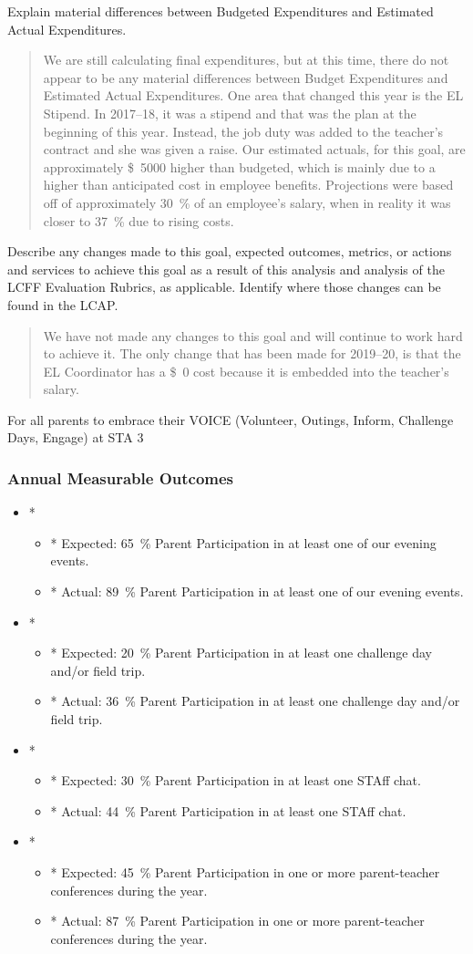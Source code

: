 \documentclass{article}
\newcommand{\dollar}[1]{\SI{#1}[\$]{}}
\newcounter{goal}[section] %
\newcommand{\outcome}[2]{
	\item*
	\begin{itemize}
	\setlength{\itemsep}{0pt}
	\item* Expected: #1
	\item* Actual: #2
	\end{itemize}
}
\newenvironment{outcomes}
	{
		\subsubsection{Annual Measurable Outcomes}
		\begin{itemize}
	}
	{\end{itemize}}
\newcounter{action}[goal]
\begin{document}
Explain material differences between Budgeted Expenditures and Estimated Actual Expenditures.
\begin{quotation}
	We are still calculating final expenditures, but at this time, there do not appear to be any material differences between Budget Expenditures and Estimated Actual Expenditures. One area that changed this year is the EL Stipend. In 2017--18, it was a stipend and that was the plan at the beginning of this year. Instead, the job duty was added to the teacher's contract and she was given a raise. Our estimated actuals, for this goal, are approximately \dollar{5000} higher than budgeted, which is mainly due to a higher than anticipated cost in employee benefits. Projections were based off of approximately \SI{30}{\percent} of an employee's salary, when in reality it was closer to \SI{37}{\percent} due to rising costs.
\end{quotation}

Describe any changes made to this goal, expected outcomes, metrics, or actions and services to achieve this goal as a result of this analysis and analysis of the LCFF Evaluation Rubrics, as applicable. Identify where those changes can be found in the LCAP.
\begin{quotation}
	We have not made any changes to this goal and will continue to work hard to achieve it. The only change that has been made for 2019--20, is that the EL Coordinator has a \dollar{0} cost because it is embedded into the teacher's salary.
\end{quotation}

\Goal
	{For all parents to embrace their VOICE (Volunteer, Outings, Inform, Challenge Days, Engage) at STA}
	{3}
	{}

\begin{outcomes}
	\outcome
	{\SI{65}{\percent} Parent Participation in at least one of our evening events.}
	{\SI{89}{\percent} Parent Participation in at least one of our evening events.}
	\outcome
	{\SI{20}{\percent} Parent Participation in at least one challenge day and/or field trip.}
	{\SI{36}{\percent} Parent Participation in at least one challenge day and/or field trip.}
	\outcome
	{\SI{30}{\percent} Parent Participation in at least one STAff chat.}
	{\SI{44}{\percent} Parent Participation in at least one STAff chat.}
	\outcome
	{\SI{45}{\percent} Parent Participation in one or more parent-teacher conferences during the year.}
	{\SI{87}{\percent} Parent Participation in one or more parent-teacher conferences during the year.}
\end{outcomes}
\end{document}
